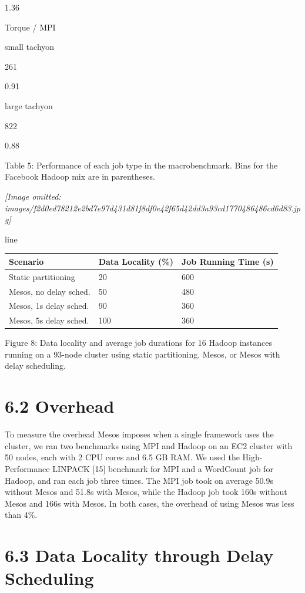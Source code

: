 \documentclass[
]{article}
\newcounter{none} %
\begin{document}
1.36

Torque / MPI

small tachyon

261

0.91

large tachyon

822

0.88

Table 5: Performance of each job type in the macrobenchmark. Bins for
the Facebook Hadoop mix are in parentheses.

\textit{[Image omitted: images/f2d0ed78212e2bd7e97d431d81f8df0e42f65d42dd3a93cd1770486486cd6d83.jpg]}

line

{\def\LTcaptype{none} %
\begin{longtable}[]{@{}lll@{}}
\toprule\noalign{}
Scenario & Data Locality (\%) & Job Running Time (s) \\
\midrule\noalign{}
\endhead
\bottomrule\noalign{}
\endlastfoot
Static partitioning & 20 & 600 \\
Mesos, no delay sched. & 50 & 480 \\
Mesos, 1s delay sched. & 90 & 360 \\
Mesos, 5s delay sched. & 100 & 360 \\
\end{longtable}
}

Figure 8: Data locality and average job durations for 16 Hadoop
instances running on a 93-node cluster using static partitioning, Mesos,
or Mesos with delay scheduling.

\section{6.2 Overhead}\label{overhead}

To measure the overhead Mesos imposes when a single framework uses the
cluster, we ran two benchmarks using MPI and Hadoop on an EC2 cluster
with 50 nodes, each with 2 CPU cores and 6.5 GB RAM. We used the
High-Performance LINPACK {[}15{]} benchmark for MPI and a WordCount job
for Hadoop, and ran each job three times. The MPI job took on average
50.9s without Mesos and 51.8s with Mesos, while the Hadoop job took 160s
without Mesos and 166s with Mesos. In both cases, the overhead of using
Mesos was less than 4\%.

\section{6.3 Data Locality through Delay
Scheduling}\label{data-locality-through-delay-scheduling}
\end{document}
